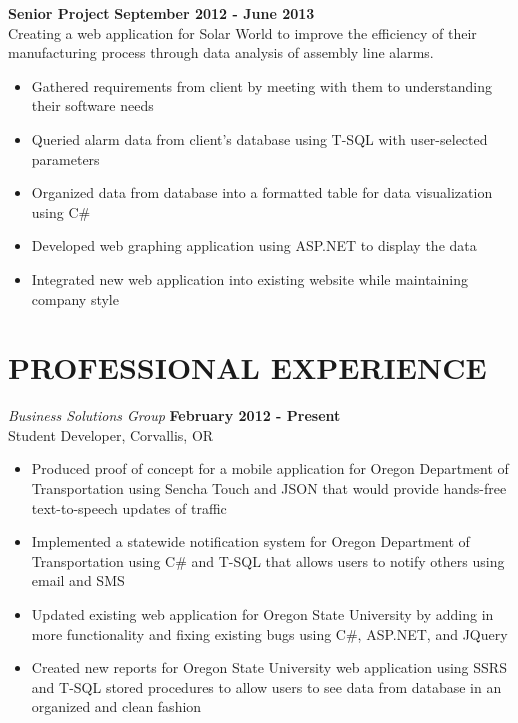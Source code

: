 \documentclass{res}
\begin{document}
\begin{resume}
{\bf Senior Project} \hfill{\bf September 2012 - June 2013}\\
Creating a web application for Solar World to improve the efficiency of their manufacturing process through data analysis of assembly line alarms.
    \begin{itemize} \itemsep 1pt
    \item Gathered requirements from client by meeting with them to understanding their software needs
    \item Queried alarm data from client's database using T-SQL with user-selected parameters
    \item Organized data from database into a formatted table for data visualization using C\#
    \item Developed web graphing application using ASP.NET to display the data
    \item Integrated new web application into existing website while maintaining company style
    \end{itemize}

\vspace{0.2in}
\section{PROFESSIONAL EXPERIENCE}
\vspace{8pt}
{\sl Business Solutions Group} \hfill       {\bf February 2012 - Present} \\
Student Developer, Corvallis, OR

   \begin{itemize} \itemsep 1pt %
   \item Produced proof of concept for a mobile application for Oregon Department of Transportation using Sencha Touch and JSON that would provide hands-free text-to-speech updates of traffic
   \item Implemented a statewide notification system for Oregon Department of Transportation using C\# and T-SQL that allows users to notify others using email and SMS
   \item Updated existing web application for Oregon State University by adding in more functionality and fixing existing bugs using C\#, ASP.NET, and JQuery
   \item Created new reports for Oregon State University web application using SSRS and T-SQL stored procedures to allow users to see data from database in an organized and clean fashion
 \end{itemize}
\end{resume}
\end{document}
